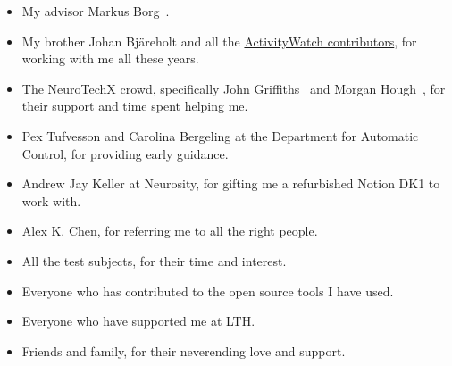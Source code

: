 \begin{itemize}
 \item My advisor Markus Borg~.
 \item My brother Johan Bjäreholt and all the \href{https://activitywatch.net/contributors/}{ActivityWatch contributors}, for working with me all these years.
 \item The NeuroTechX crowd, specifically John Griffiths~ and Morgan Hough~, for their support and time spent helping me.
 \item Pex Tufvesson and Carolina Bergeling at the Department for Automatic Control, for providing early guidance.
 \item Andrew Jay Keller at Neurosity, for gifting me a refurbished Notion DK1 to work with.
 \item Alex K. Chen, for referring me to all the right people.
 \item All the test subjects, for their time and interest.
 \item Everyone who has contributed to the open source tools I have used.
 \item Everyone who have supported me at LTH\@.
 \item Friends and family, for their neverending love and support.
\end{itemize}
